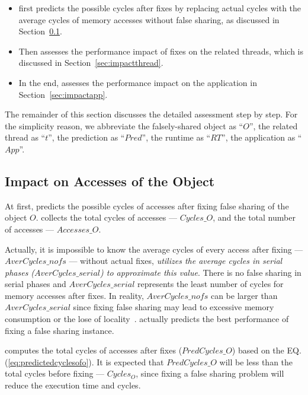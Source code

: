 \begin{itemize}
\item \cheetah{} first predicts the possible cycles after fixes by replacing actual cycles with the average cycles of memory accesses without false sharing, as discussed in Section~\ref{sec:impactobject}. 

\item Then \cheetah{} assesses the performance impact of fixes on the related threads, which is discussed in Section~\ref{sec:impactthread}. 
 
\item In the end, \cheetah{} assesses the performance impact on the application in Section~\ref{sec:impactapp}. 
\end{itemize}

The remainder of this section discusses the detailed assessment step by step. For the simplicity reason, we abbreviate the falsely-shared object as ``$O$'', the related thread as ``$t$'', the prediction as ``$Pred$'', the runtime as ``$RT$'', the application as ``$App$''. 

\subsection{Impact on Accesses of the Object}
\label{sec:impactobject}

At first, \cheetah{} predicts the possible cycles of accesses after fixing false sharing of the object $O$. \cheetah{} collects the total cycles of accesses --- $Cycles\_O$, and the total number of accesses --- $Accesses\_O$. 

Actually, it is impossible to know the average cycles of every access after fixing --- $AverCycles\_{nofs}$ --- without actual fixes, {\it \cheetah{} utilizes the average cycles in serial phases ($AverCycles\_{serial}$) to approximate this value}. There is no false sharing in serial phases and $AverCycles\_{serial}$ represents the least number of cycles for memory accesses after fixes. In reality, $AverCycles\_{nofs}$ can be larger than $AverCycles\_{serial}$ since fixing false sharing may lead to excessive memory consumption or the lose of locality~\cite{qinzhao}. \cheetah{} actually predicts the best performance of fixing a false sharing instance. 
 
\cheetah{} computes the total cycles of accesses after fixes ($PredCycles\_{O}$) based on the EQ.(\ref{eq:predictedcyclesofo}).  It is expected that $PredCycles\_{O}$ will be less than the total cycles before fixing --- $Cycles_O$, since fixing a false sharing problem will reduce the execution time and cycles.  

